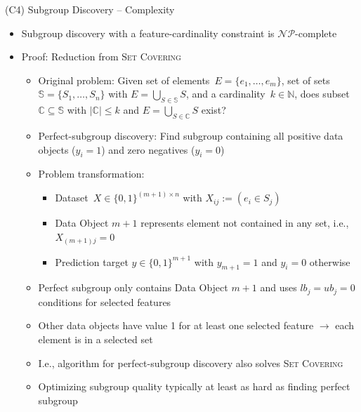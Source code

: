 \documentclass[en, navbarinline, handout]{sdqbeamer}
\begin{document}
\begin{frame}[t]{(C4) Subgroup Discovery -- Complexity}
	\begin{itemize}
		\item Subgroup discovery with a feature-cardinality constraint is $\mathcal{NP}$-complete
		\item Proof: Reduction from \textsc{Set Covering}~\cite{karp1972reducibility}
		\begin{itemize}
			\item Original problem: Given set of elements~$E = \{e_1, \dots, e_m\}$, set of sets~$\mathbb{S} = \{S_1,  \dots, S_n\}$ with $E = \bigcup_{S \in \mathbb{S}} S$, and a cardinality~$k \in \mathbb{N}$, does subset $\mathbb{C} \subseteq \mathbb{S}$ with $|\mathbb{C}| \leq k$ and $E = \bigcup_{S \in \mathbb{C}} S$ exist?
			\item Perfect-subgroup discovery: Find subgroup containing all positive data objects ($y_i = 1$) and zero negatives ($y_i = 0$)
			\item Problem transformation:
			\begin{itemize}
				\item Dataset~$X \in \{0, 1\}^{(m + 1) \times n}$ with $X_{ij} := (e_i \in S_j)$
				\item Data Object $m+1$ represents element not contained in any set, i.e., $X_{(m+1)j} = 0$
				\item Prediction target $y \in \{0, 1\}^{m+1}$ with $y_{m+1} = 1$ and $y_i = 0$ otherwise
			\end{itemize}
			\item Perfect subgroup only contains Data Object $m+1$ and uses $\mathit{lb}_j = \mathit{ub}_j = 0$ conditions for selected features
			\item Other data objects have value 1 for at least one selected feature $\rightarrow$ each element is in a selected set
			\item I.e., algorithm for perfect-subgroup discovery also solves \textsc{Set Covering}
			\item Optimizing subgroup quality typically at least as hard as finding perfect subgroup
		\end{itemize}
	\end{itemize}
\end{frame}
\end{document}
